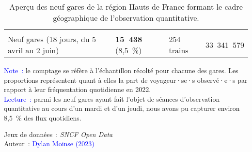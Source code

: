 \begin{table}[h!]
{\begin{tabular}{p{}p{}p{}p{}p{}}
      \hdashline
    \multicolumn{5}{l}{\textbf{Échantillon complet}}\\
\multicolumn{2}{l}{\small{Neuf gares (18 jours, du 5 avril au 2 juin)}} & \small{\textbf{15~438} (8,5~\%)} & \small{254 trains} & \small{33~341~579}\\
      \hline
    \end{tabular}}
    \caption{Aperçu des neuf gares de la région Hauts-de-France formant le cadre géographique de l'observation quantitative.}
    \label{table-chap3:application-observation-quantitative-gares-examinees}
    \vspace{5pt}
        \begin{flushleft}\scriptsize
        \textcolor{blue}{Note~:} le comptage se réfère à l'échantillon récolté pour chacune des gares. Les proportions représentent quant à elles la part de voyageur·se·s observé·e·s par rapport à leur fréquentation quotidienne en 2022.
        \\
        \textcolor{blue}{Lecture~:} parmi les neuf gares ayant fait l'objet de séances d'observation quantitative au cours d'un mardi et d'un jeudi, nous avons pu capturer environ 8,5~\% des flux quotidiens.
        \end{flushleft}
        \begin{flushright}\scriptsize
        Jeux de données~: \textsl{SNCF Open Data} \textcolor{blue}{\autocite{sncf_frequentation_2024}}
        \\
        Auteur~: \textcolor{blue}{Dylan Moinse (2023)}
        \end{flushright}
        \end{table}